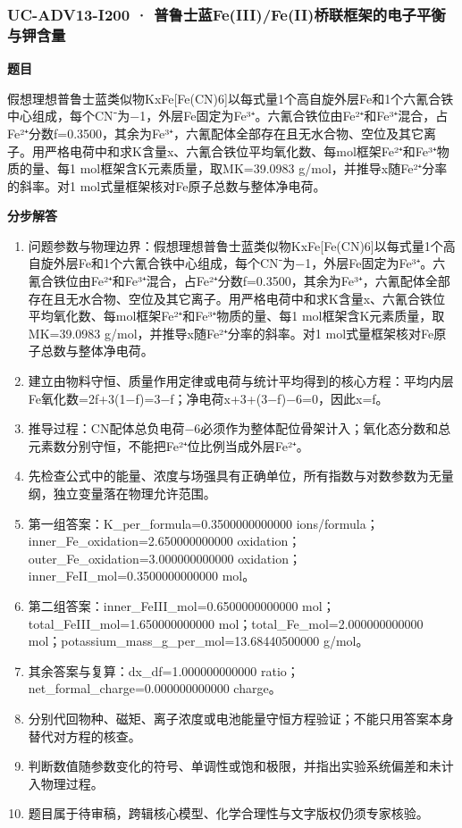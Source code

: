 \documentclass[UTF8,11pt,a4paper]{ctexart}
\begin{document}
\subsubsection*{UC-ADV13-I200 · 普鲁士蓝Fe(III)/Fe(II)桥联框架的电子平衡与钾含量}
\noindent\textbf{题目}\par
假想理想普鲁士蓝类似物KxFe[Fe(CN)6]以每式量1个高自旋外层Fe和1个六氰合铁中心组成，每个CN⁻为−1，外层Fe固定为Fe³⁺。六氰合铁位由Fe²⁺和Fe³⁺混合，占Fe²⁺分数f=0.3500，其余为Fe³⁺，六氰配体全部存在且无水合物、空位及其它离子。用严格电荷中和求K含量x、六氰合铁位平均氧化数、每mol框架Fe²⁺和Fe³⁺物质的量、每1 mol框架含K元素质量，取MK=39.0983 g/mol，并推导x随Fe²⁺分率的斜率。对1 mol式量框架核对Fe原子总数与整体净电荷。\par
\medskip\noindent\textbf{分步解答}
\begin{enumerate}
\item 问题参数与物理边界：假想理想普鲁士蓝类似物KxFe[Fe(CN)6]以每式量1个高自旋外层Fe和1个六氰合铁中心组成，每个CN⁻为−1，外层Fe固定为Fe³⁺。六氰合铁位由Fe²⁺和Fe³⁺混合，占Fe²⁺分数f=0.3500，其余为Fe³⁺，六氰配体全部存在且无水合物、空位及其它离子。用严格电荷中和求K含量x、六氰合铁位平均氧化数、每mol框架Fe²⁺和Fe³⁺物质的量、每1 mol框架含K元素质量，取MK=39.0983 g/mol，并推导x随Fe²⁺分率的斜率。对1 mol式量框架核对Fe原子总数与整体净电荷。
\item 建立由物料守恒、质量作用定律或电荷与统计平均得到的核心方程：平均内层Fe氧化数=2f+3(1−f)=3−f；净电荷x+3+(3−f)−6=0，因此x=f。
\item 推导过程：CN配体总负电荷−6必须作为整体配位骨架计入；氧化态分数和总元素数分别守恒，不能把Fe²⁺位比例当成外层Fe²⁺。
\item 先检查公式中的能量、浓度与场强具有正确单位，所有指数与对数参数为无量纲，独立变量落在物理允许范围。
\item 第一组答案：K\_per\_formula=0.3500000000000 ions/formula；inner\_Fe\_oxidation=2.650000000000 oxidation；outer\_Fe\_oxidation=3.000000000000 oxidation；inner\_FeII\_mol=0.3500000000000 mol。
\item 第二组答案：inner\_FeIII\_mol=0.6500000000000 mol；total\_FeIII\_mol=1.650000000000 mol；total\_Fe\_mol=2.000000000000 mol；potassium\_mass\_g\_per\_mol=13.68440500000 g/mol。
\item 其余答案与复算：dx\_df=1.000000000000 ratio；net\_formal\_charge=0.000000000000 charge。
\item 分别代回物种、磁矩、离子浓度或电池能量守恒方程验证；不能只用答案本身替代对方程的核查。
\item 判断数值随参数变化的符号、单调性或饱和极限，并指出实验系统偏差和未计入物理过程。
\item 题目属于待审稿，跨辑核心模型、化学合理性与文字版权仍须专家核验。
\end{enumerate}
\end{document}
